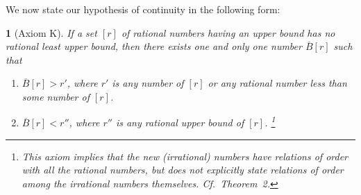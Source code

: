 \documentclass[a4paper,12pt]{book}[2004/02/16]
\providecommand{\hyperlink}[2]{#2}
\providecommand{\hypertarget}[2]{#2}
\theoremstyle{ilemma}
\theoremstyle{itheorem}
\theoremstyle{iother}
\newtheorem{other}{}
\theoremstyle{icorollary}
\theoremstyle{numcorollary}
\theoremstyle{idefinition}
\begin{document}
We now state our hypothesis of continuity in the following
form:
\begin{other}[Axiom K]\hypertarget{axiomK}{}
If a set $[r]$ of rational numbers having an upper
bound has no rational least upper bound, then there exists one and
only one number $\overline{B}[r]$ such that
\begin{enumerate}
\item[(a)] $\overline{B}[r] > r'$, where $r'$ is any number of $[r]$
or any rational number less than some number of $[r]$.
\item[(b)] $\overline{B}[r] < r''$, where $r''$ is any rational upper
bound of $[r]$.%
\footnote{%
  This axiom implies that the new (irrational) numbers have relations
  of order with all the rational numbers, but does not explicitly
  state relations
  of order among the irrational numbers themselves. Cf.\ Theorem~\hyperlink{thm2}{2}.}
\end{enumerate}
\end{other}
\end{document}
